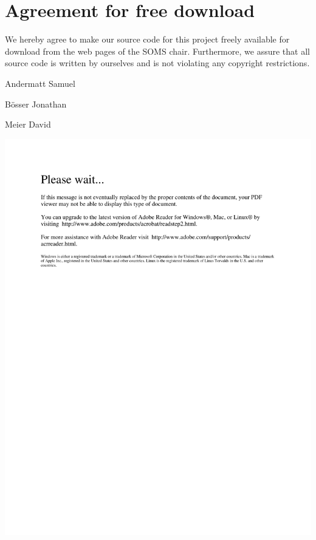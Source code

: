 \documentclass[11pt,twoside]{article}
\begin{document}

\newpage


\newpage
\section*{Agreement for free download}
\bigskip

\bigskip

\large We hereby agree to make our source code for this project freely available for download from the web pages of the SOMS chair. Furthermore, we assure that all source code is written by ourselves and is not violating any copyright restrictions.

\begin{center}
\bigskip\bigskip\bigskip\bigskip\bigskip\bigskip\bigskip\bigskip\bigskip


\large Andermatt Samuel
\bigskip\bigskip\bigskip\bigskip\bigskip\bigskip\bigskip\bigskip\bigskip

\large B\"osser Jonathan
\bigskip\bigskip\bigskip\bigskip\bigskip\bigskip\bigskip\bigskip\bigskip

\large Meier David

\end{center}
\newpage


\includegraphics{confirmation.pdf}
\end{document}
